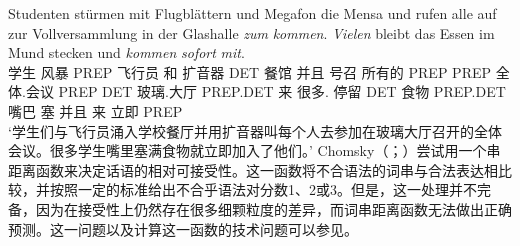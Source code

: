 \ea
\gll Studenten stürmen mit Flugblättern und Megafon die Mensa und rufen alle auf zur Vollversammlung in der Glashalle \emph{zum} \emph{kommen}. \emph{Vielen} bleibt das Essen im Mund stecken und \emph{kommen} \emph{sofort} \emph{mit}.\footnotemark\\
学生 风暴 PREP 飞行员 和 扩音器 DET 餐馆 并且 号召 所有的 PREP PREP 全体.会议 PREP DET 玻璃.大厅 PREP.DET 来 很多.\dat{} 停留 DET 食物 PREP.DET 嘴巴 塞 并且 来 立即 PREP\\
\glt `学生们与飞行员涌入学校餐厅并用扩音器叫每个人去参加在玻璃大厅召开的全体会议。很多学生嘴里塞满食物就立即加入了他们。'
\z
Chomsky（\citeyear[\S~5]{Chomsky75a}；\citeyear{Chomsky64a}）尝试用一个串距离函数来决定话语的相对可接受性。这一函数将不合语法的词串与合法表达相比较，并按照一定的标准给出不合乎语法对分数1、2或3。但是，这一处理并不完备，因为在接受性上仍然存在很多细颗粒度的差异，而词串距离函数无法做出正确预测。这一问题以及计算这一函数的技术问题可以参见。

